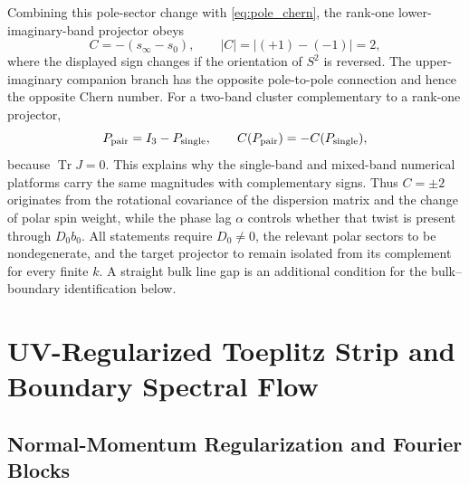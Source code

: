 \documentclass[11pt]{article}
\numberwithin{equation}{section}
\begin{document}
Combining this pole-sector change with \eqref{eq:pole_chern},
the rank-one lower-imaginary-band projector obeys
\begin{equation}
  C=-\left(s_\infty-s_0\right),
  \qquad
  |C|=|(+1)-(-1)|=2,
  \label{eq:lower_imaginary_band_chern}
\end{equation}
where the displayed sign changes if the orientation of $S^2$ is reversed.
The upper-imaginary companion branch has the opposite pole-to-pole connection and hence
the opposite Chern number. For a two-band cluster complementary to a
rank-one projector,
\begin{equation}
  P_{\rm pair}=I_3-P_{\rm single},
  \qquad
  C(P_{\rm pair})=-C(P_{\rm single}),
  \label{eq:complementary_cluster_chern}
\end{equation}
because $\operatorname{Tr}J=0$. This explains why the single-band and
mixed-band numerical platforms carry the same magnitudes with
complementary signs. Thus $C=\pm2$ originates from the rotational
covariance of the dispersion matrix and the change of polar spin
weight, while the phase lag $\alpha$ controls whether that twist is
present through $D_0b_0$. All statements require $D_0\ne0$, the relevant
polar sectors to be nondegenerate, and the target projector to remain
isolated from its complement for every finite $k$. A straight bulk line
gap is an additional condition for the bulk--boundary identification below.

\section{UV-Regularized Toeplitz Strip and Boundary Spectral Flow}

\subsection{Normal-Momentum Regularization and Fourier Blocks}
\end{document}
